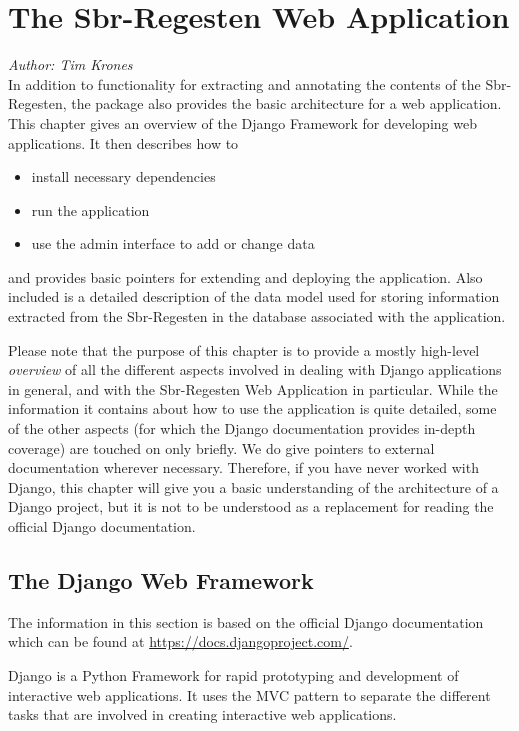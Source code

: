 \section{The Sbr-Regesten Web Application}
\label{sec:webapp}

\emph{Author: Tim Krones} \\

In addition to functionality for extracting and annotating the
contents of the Sbr-Regesten, the package also provides the basic
architecture for a web application. This chapter gives an overview of
the Django Framework for developing web applications. It then describes
how to

\begin{itemize}
\item install necessary dependencies
\item run the application
\item use the admin interface to add or change data
\end{itemize}

and provides basic pointers for extending and deploying the
application. Also included is a detailed description of the data model
used for storing information extracted from the Sbr-Regesten in the
database associated with the application.

Please note that the purpose of this chapter is to provide a mostly
high-level \emph{overview} of all the different aspects involved in
dealing with Django applications in general, and with the Sbr-Regesten
Web Application in particular. While the information it contains about
how to use the application is quite detailed, some of the other
aspects (for which the Django documentation provides in-depth
coverage) are touched on only briefly. We do give pointers to external
documentation wherever necessary. Therefore, if you have never worked
with Django, this chapter will give you a basic understanding of the
architecture of a Django project, but it is not to be understood as a
replacement for reading the official Django documentation.

\subsection{The Django Web Framework}
\label{sec:django}

The information in this section is based on the official Django
documentation which can be found at
\url{https://docs.djangoproject.com/}.

Django is a Python Framework for rapid prototyping and development of
interactive web applications. It uses the MVC pattern to separate the
different tasks that are involved in creating interactive web
applications.

